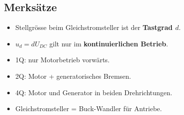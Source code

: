\subsection{Merksätze}

\begin{itemize}
\item Stellgrösse beim Gleichstromsteller ist der \textbf{Tastgrad $d$}.
\item $u_d = d U_{DC}$ gilt nur im \textbf{kontinuierlichen Betrieb}.
\item 1Q: nur Motorbetrieb vorwärts.
\item 2Q: Motor + generatorisches Bremsen.
\item 4Q: Motor und Generator in beiden Drehrichtungen.
\item Gleichstromsteller = Buck-Wandler für Antriebe.
\end{itemize}
